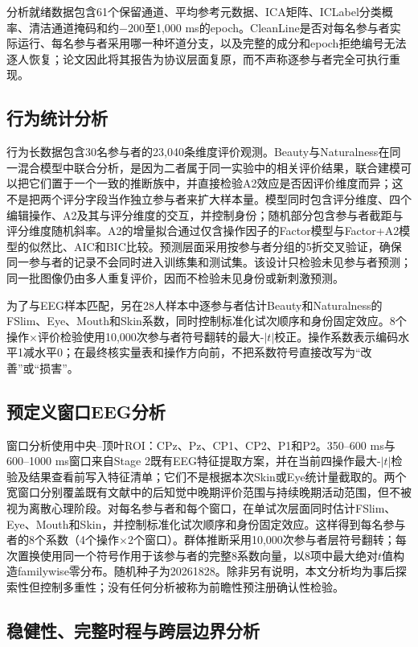 \documentclass[preprint,12pt,authoryear]{elsarticle}
\begin{document}
分析就绪数据包含61个保留通道、平均参考元数据、ICA矩阵、ICLabel分类概率、清洁通道掩码和约$-200$至1,000 ms的epoch。CleanLine是否对每名参与者实际运行、每名参与者采用哪一种坏道分支，以及完整的成分和epoch拒绝编号无法逐人恢复；论文因此将其报告为协议层面复原，而不声称逐参与者完全可执行重现。

\subsection{行为统计分析}

行为长数据包含30名参与者的23,040条维度评价观测。Beauty与Naturalness在同一混合模型中联合分析，是因为二者属于同一实验中的相关评价结果，联合建模可以把它们置于一个一致的推断族中，并直接检验A2效应是否因评价维度而异；这不是把两个评分字段当作独立参与者来扩大样本量。模型同时包含评分维度、四个编辑操作、A2及其与评分维度的交互，并控制身份；随机部分包含参与者截距与评分维度随机斜率。A2的增量拟合通过仅含操作因子的Factor模型与Factor+A2模型的似然比、AIC和BIC比较。预测层面采用按参与者分组的5折交叉验证，确保同一参与者的记录不会同时进入训练集和测试集。该设计只检验未见参与者预测；同一批图像仍由多人重复评价，因而不检验未见身份或新刺激预测。

为了与EEG样本匹配，另在28人样本中逐参与者估计Beauty和Naturalness的FSlim、Eye、Mouth和Skin系数，同时控制标准化试次顺序和身份固定效应。8个操作$\times$评价检验使用10,000次参与者符号翻转的最大-$|t|$校正。操作系数表示编码水平1减水平0；在最终核实量表和操作方向前，不把系数符号直接改写为“改善”或“损害”。

\subsection{预定义窗口EEG分析}

窗口分析使用中央--顶叶ROI：CPz、Pz、CP1、CP2、P1和P2。350--600 ms与600--1000 ms窗口来自Stage 2既有EEG特征提取方案，并在当前四操作最大-$|t|$检验及结果查看前写入特征清单；它们不是根据本次Skin或Eye统计量截取的。两个宽窗口分别覆盖既有文献中的后知觉中晚期评价范围与持续晚期活动范围\citep{Schacht2008,Revers2023,Han2022}，但不被视为离散心理阶段。对每名参与者和每个窗口，在单试次层面同时估计FSlim、Eye、Mouth和Skin，并控制标准化试次顺序和身份固定效应。这样得到每名参与者的8个系数（4个操作$\times$2个窗口）。群体推断采用10,000次参与者层符号翻转；每次置换使用同一个符号作用于该参与者的完整8系数向量，以8项中最大绝对$t$值构造familywise零分布。随机种子为20261828。除非另有说明，本文分析均为事后探索性但控制多重性；没有任何分析被称为前瞻性预注册确认性检验。

\subsection{稳健性、完整时程与跨层边界分析}
\end{document}
